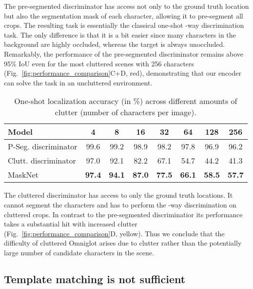 \documentclass{article}
\begin{document}
The pre-segmented discriminator has access not only to the ground truth location but also the segmentation mask of each character, allowing it to pre-segment all crops.
The resulting task is essentially the classical one-shot -way discrimination task.
The only difference is that it is a bit easier since many characters in the background are highly occluded, whereas the target is always unoccluded.
Remarkably, the performance of the pre-segmented discriminator remains above 95\% IoU even for the most cluttered scenes with 256 characters (Fig.~\ref{fig:performance_comparison}C+D, red), demonstrating that our encoder can solve the task in an uncluttered environment.

\begin{table}[t]
\vspace{-6pt}
\caption{One-shot localization accuracy (in \%) across different amounts of clutter (number of characters per image).}
\label{table:results_distance}
\vspace{-0.25cm}
\begin{center}
\begin{tiny}
\begin{sc}
\begin{tabular}{lccccccc}
\toprule
Model & 4 & 8 & 16 & 32 & 64 & 128 & 256 \\
\midrule
P-Seg. discriminator & 99.6 & 99.2 & 98.9 & 98.2 & 97.8 & 96.9 & 96.2\\
\midrule
Clutt. discriminator & 97.0 & 92.1 & 82.2 & 67.1 & 54.7 & 44.2 & 41.3\\
MaskNet & \bf{97.4} & \bf{94.1} & \bf{87.0} & \bf{77.5} & \bf{66.1} & \bf{58.5} & \bf{57.7}\\
\bottomrule
\end{tabular}
\end{sc}
\end{tiny}
\end{center}
\vskip -0.1in
\end{table}

The cluttered discriminator has access to only the ground truth locations.
It cannot segment the characters and has to perform the -way discrimination on cluttered crops.
In contrast to the pre-segmented discriminatior its performance takes a substantial hit with increased clutter (Fig.~\ref{fig:performance_comparison}D, yellow). Thus we conclude that the difficulty of cluttered Omniglot arises due to clutter rather than the potentially large number of candidate characters in the scene.


\subsection{Template matching is not sufficient}
\end{document}
